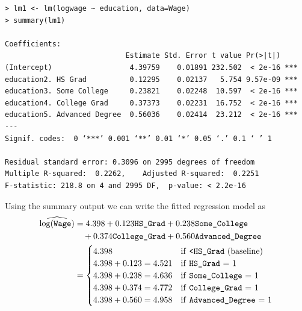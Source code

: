 \documentclass[10pt]{beamer}\usepackage[]{graphicx}\usepackage[]{color}
\begin{document}
\begin{frame}[fragile]
\small
\begin{verbatim}
> lm1 <- lm(logwage ~ education, data=Wage)
> summary(lm1)

Coefficients:
                            Estimate Std. Error t value Pr(>|t|)    
(Intercept)                  4.39759    0.01891 232.502  < 2e-16 ***
education2. HS Grad          0.12295    0.02137   5.754 9.57e-09 ***
education3. Some College     0.23821    0.02248  10.597  < 2e-16 ***
education4. College Grad     0.37373    0.02231  16.752  < 2e-16 ***
education5. Advanced Degree  0.56036    0.02414  23.212  < 2e-16 ***
---
Signif. codes:  0 ‘***’ 0.001 ‘**’ 0.01 ‘*’ 0.05 ‘.’ 0.1 ‘ ’ 1

Residual standard error: 0.3096 on 2995 degrees of freedom
Multiple R-squared:  0.2262,	Adjusted R-squared:  0.2251 
F-statistic: 218.8 on 4 and 2995 DF,  p-value: < 2.2e-16
\end{verbatim}
\end{frame}

\begin{frame}[fragile]
Using the summary output we can write the fitted regression model as
\begin{align*}
\widehat{\log(\texttt{Wage})} &=  4.398 + 0.123 \texttt{HS\_Grad} + 0.238 \texttt{Some\_College}\\ 
& \quad + 0.374 \texttt{College\_Grad} + 0.560 \texttt{Advanced\_Degree}\\
& = \begin{cases}
4.398 & \text{if  \texttt{<HS\_Grad} (baseline)}\\
4.398 + 0.123 = 4.521  & \text{if \texttt{HS\_Grad}  = 1}\\
4.398 + 0.238 = 4.636 & \text{if \texttt{Some\_College}  = 1}\\
4.398 + 0.374 = 4.772  & \text{if \texttt{College\_Grad}  = 1}\\
4.398 + 0.560 = 4.958 & \text{if \texttt{Advanced\_Degree}  = 1}
\end{cases}
\end{align*}
\end{frame}
\end{document}
